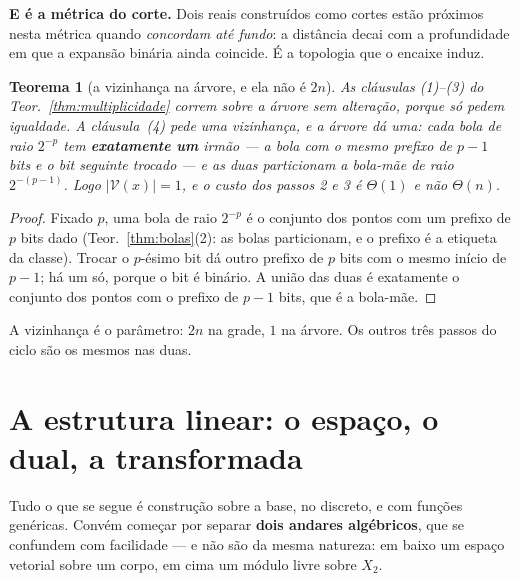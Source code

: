 \documentclass[11pt,a4paper]{article}
\newcommand{\Zc}{\ensuremath{X_2}}
\newtheorem{teorema}{Teorema}
\begin{document}
\medskip\noindent\textbf{E é a métrica do corte.} Dois reais construídos como
cortes estão próximos nesta métrica quando \emph{concordam até fundo}: a
distância decai com a profundidade em que a expansão binária ainda coincide.
É a topologia que o encaixe induz.

\begin{teorema}[a vizinhança na árvore, e ela não é $2n$]\label{thm:viz-arvore}
As cláusulas (1)--(3) do Teor.~\ref{thm:multiplicidade} correm sobre a árvore
sem alteração, porque só pedem igualdade. A cláusula~(4) pede uma
\emph{vizinhança}, e a árvore dá uma: cada bola de raio $2^{-p}$ tem
\textbf{exatamente um} irmão --- a bola com o mesmo prefixo de $p-1$ bits e o
bit seguinte trocado --- e as duas particionam a bola-mãe de raio $2^{-(p-1)}$.
Logo $\lvert \mathcal{V}(x)\rvert=1$, e o custo dos passos 2 e 3 é $\Theta(1)$ e não
$\Theta(n)$.
\end{teorema}

\begin{proof}
Fixado $p$, uma bola de raio $2^{-p}$ é o conjunto dos pontos com um prefixo de
$p$ bits dado (Teor.~\ref{thm:bolas}(2): as bolas particionam, e o prefixo é a
etiqueta da classe). Trocar o $p$-ésimo bit dá outro prefixo de $p$ bits com o
mesmo início de $p-1$; há um só, porque o bit é binário. A união das duas é
exatamente o conjunto dos pontos com o prefixo de $p-1$ bits, que é a bola-mãe.
\end{proof}

\medskip\noindent A vizinhança é o parâmetro: $2n$ na grade, $1$ na árvore. Os
outros três passos do ciclo são os mesmos nas duas.

\section{A estrutura linear: o espaço, o dual, a transformada}\label{sec:transf}

\noindent Tudo o que se segue é construção sobre a base, no discreto, e com
funções genéricas. Convém começar por separar \textbf{dois andares algébricos},
que se confundem com facilidade --- e não são da mesma natureza: em baixo um
espaço vetorial sobre um corpo, em cima um módulo livre sobre \Zc.
\end{document}

